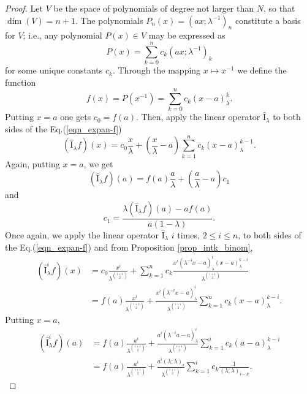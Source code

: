 \documentclass[12pt]{article}
\newcommand{\I}{\widehat{\mathrm{I}}}
\begin{document}
\begin{proof}
Let $V$ be the space of polynomials of degree not larger than $N$, so that $\dim(V)=n+1$. The polynomials $P_{n}(x)=(ax;\lambda^{-1})_{n}$ constitute a basis for $V$; i.e., any polynomial $P(x)\in V$ may be expressed as
\begin{equation}
    P(x)=\sum_{k=0}^{n}c_{k}(ax;\lambda^{-1})_{k}
\end{equation}
for some unique constants $c_{k}$. Through the mapping $x\mapsto x^{-1}$ we define the function 
\begin{equation}\label{eqn_expan-f}
    f(x)=P(x^{-1})=\sum_{k=0}^{n}c_{k}(x-a)_{\lambda}^k.
\end{equation}
Putting $x=a$ one gets $c_{0}=f(a)$. Then, apply the linear operator $\I_{\lambda}$ to both sides of the Eq.(\ref{eqn_expan-f})
\begin{equation}
    (\I_{\lambda}f)(x)=c_{0}\frac{x}{\lambda}+\left(\frac{x}{\lambda}-a\right)\sum_{k=1}^{n}c_{k}(x-a)_{\lambda}^{k-1}.
\end{equation}
Again, putting $x=a$, we get
\begin{equation}\label{eqn_sys2}
    (\I_{\lambda}f)(a)=f(a)\frac{a}{\lambda}+\left(\frac{a}{\lambda}-a\right)c_{1}
\end{equation}
and
\begin{equation}
    c_{1}=\frac{\lambda(\I_{\lambda}f)(a)-af(a)}{a(1-\lambda)}.    
\end{equation}
Once again, we apply the linear operator $\I_{\lambda}$ $i$ times, $2\leq i\leq n$, to both sides of the Eq.(\ref{eqn_expan-f}) and from Proposition \ref{prop_intk_binom},
\begin{align*}
    (\I_{\lambda}^if)(x)&=c_{0}\frac{x^i}{\lambda^{\binom{i+1}{2}}}+\sum_{k=1}^{n}c_{k}\frac{x^i(\lambda^{-i}x-a)_{\lambda}^i(x-a)_{\lambda}^{k-i}}{\lambda^{\binom{i+1}{2}}}\\
    &=f(a)\frac{x^i}{\lambda^{\binom{i+1}{2}}}+\frac{x^i(\lambda^{-i}x-a)_{\lambda}^i}{\lambda^{\binom{i+1}{2}}}\sum_{k=1}^{n}c_{k}(x-a)_{\lambda}^{k-i}.
\end{align*}
Putting $x=a$,
\begin{align}
    (\I_{\lambda}^if)(a)&=f(a)\frac{a^i}{\lambda^{\binom{i+1}{2}}}+\frac{a^i(\lambda^{-i}a-a)_{\lambda}^i}{\lambda^{\binom{i+1}{2}}}\sum_{k=1}^{i}c_{k}(a-a)_{\lambda}^{k-i}\nonumber\\
    &=f(a)\frac{a^i}{\lambda^{\binom{i+1}{2}}}+\frac{a^i(\lambda;\lambda)_{i}}{\lambda^{\binom{i+1}{2}}}\sum_{k=1}^{i}c_{k}\frac{1}{(\lambda;\lambda)_{i-k}}.\label{eqn_sys3}

\end{align}
\end{proof}
\end{document}
